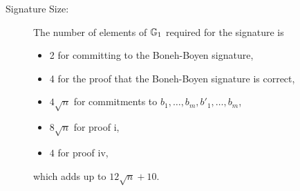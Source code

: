 
\begin{description}
\item[Signature Size:] The number of elements of $\mathbb{G}_1$ required  for the signature is
\begin{itemize}
\item 2 for committing to the Boneh-Boyen signature,
\item 4 for the proof that the Boneh-Boyen signature is correct,
\item $4\sqrt{n}$ for commitments to $b_1,\ldots,b_m,b'_1,\ldots,b_m$,
\item $8\sqrt{n}$ for proof i,
\item $4$ for proof iv,
\end{itemize}
which adds up to $12\sqrt{n}+10$.


\end{description}
